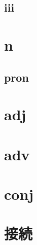 \newpage

\subsection{iii}

\newpage

\section{n}

\newpage

\subsection{pron}

\newpage

\section{adj}

\newpage

\section{adv}

\newpage

\section{conj}

\newpage

\section{接続}

\newpage